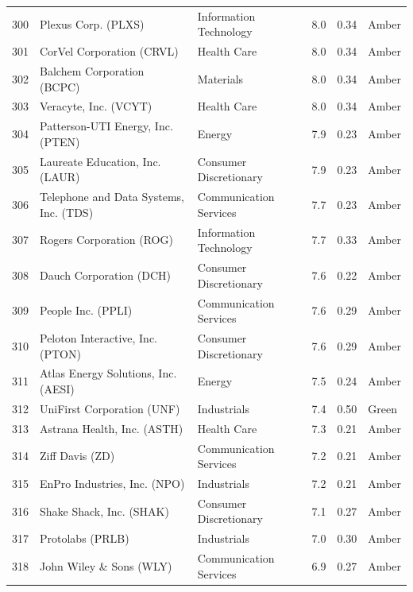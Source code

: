 \documentclass[11pt,a4paper]{article}
\begin{document}
{\begin{longtable}{r p{4.6cm} p{3cm} r r l}
300 & Plexus Corp. (PLXS) & Information Technology & 8.0 & 0.34 & \cellcolor[HTML]{FFEB9C}Amber \\
301 & CorVel Corporation (CRVL) & Health Care & 8.0 & 0.34 & \cellcolor[HTML]{FFEB9C}Amber \\
302 & Balchem Corporation (BCPC) & Materials & 8.0 & 0.34 & \cellcolor[HTML]{FFEB9C}Amber \\
303 & Veracyte, Inc. (VCYT) & Health Care & 8.0 & 0.34 & \cellcolor[HTML]{FFEB9C}Amber \\
304 & Patterson-UTI Energy, Inc. (PTEN) & Energy & 7.9 & 0.23 & \cellcolor[HTML]{FFEB9C}Amber \\
305 & Laureate Education, Inc. (LAUR) & Consumer Discretionary & 7.9 & 0.23 & \cellcolor[HTML]{FFEB9C}Amber \\
306 & Telephone and Data Systems, Inc. (TDS) & Communication Services & 7.7 & 0.23 & \cellcolor[HTML]{FFEB9C}Amber \\
307 & Rogers Corporation (ROG) & Information Technology & 7.7 & 0.33 & \cellcolor[HTML]{FFEB9C}Amber \\
308 & Dauch Corporation (DCH) & Consumer Discretionary & 7.6 & 0.22 & \cellcolor[HTML]{FFEB9C}Amber \\
309 & People Inc. (PPLI) & Communication Services & 7.6 & 0.29 & \cellcolor[HTML]{FFEB9C}Amber \\
310 & Peloton Interactive, Inc. (PTON) & Consumer Discretionary & 7.6 & 0.29 & \cellcolor[HTML]{FFEB9C}Amber \\
311 & Atlas Energy Solutions, Inc. (AESI) & Energy & 7.5 & 0.24 & \cellcolor[HTML]{FFEB9C}Amber \\
312 & UniFirst Corporation (UNF) & Industrials & 7.4 & 0.50 & \cellcolor[HTML]{C6EFCE}Green \\
313 & Astrana Health, Inc. (ASTH) & Health Care & 7.3 & 0.21 & \cellcolor[HTML]{FFEB9C}Amber \\
314 & Ziff Davis (ZD) & Communication Services & 7.2 & 0.21 & \cellcolor[HTML]{FFEB9C}Amber \\
315 & EnPro Industries, Inc. (NPO) & Industrials & 7.2 & 0.21 & \cellcolor[HTML]{FFEB9C}Amber \\
316 & Shake Shack, Inc. (SHAK) & Consumer Discretionary & 7.1 & 0.27 & \cellcolor[HTML]{FFEB9C}Amber \\
317 & Protolabs (PRLB) & Industrials & 7.0 & 0.30 & \cellcolor[HTML]{FFEB9C}Amber \\
318 & John Wiley \& Sons (WLY) & Communication Services & 6.9 & 0.27 & \cellcolor[HTML]{FFEB9C}Amber \\

\end{longtable}}
\end{document}
